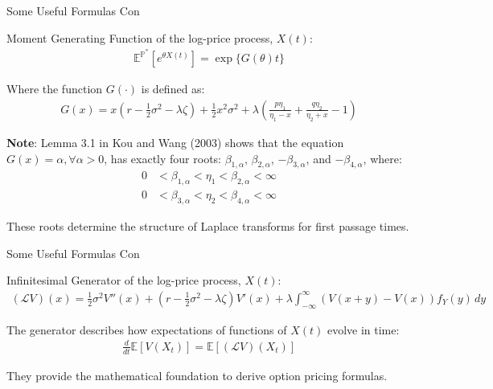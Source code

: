 \documentclass{beamer}
\begin{document}
\begin{frame}{Some Useful Formulas Con}

    {\footnotesize \footnotesize
    \par Moment Generating Function of the log-price process, \( X(t) \):
    \begin{align*}
        \mathbb{E}^{\mathbb{P}^*} \left[ e^{\theta X(t)} \right] = \exp\{G(\theta)t\}
    \end{align*}
    \par Where the function $G(\cdot)$ is defined as:
    \begin{align*}
        G(x) = x \left( r - \frac{1}{2} \sigma^2 - \lambda \zeta \right) + \frac{1}{2} x^2 \sigma^2 
        + \lambda \left( \frac{p \eta_1}{\eta_1 - x} + \frac{q \eta_2}{\eta_2 + x} - 1 \right)
    \end{align*}
    \par  \pause \textbf{Note}: Lemma 3.1 in Kou and Wang (2003) shows that the 
    equation \( G(x) = \alpha, \forall \alpha > 0 \), has exactly 
    four roots: \(\beta_{1,\alpha}\), \(\beta_{2,\alpha}\), \(-\beta_{3,\alpha}\), and \(-\beta_{4,\alpha}\), where: 
    \begin{align*}
        0 &< \beta_{1,\alpha} < \eta_1 < \beta_{2,\alpha} < \infty\\
        0 &< \beta_{3,\alpha} < \eta_2 < \beta_{4,\alpha} < \infty
    \end{align*}
    \par These roots determine the structure of Laplace transforms for first passage times.
    }
    
\end{frame}
\begin{frame}{Some Useful Formulas Con}

    {\footnotesize \footnotesize
    \par Infinitesimal Generator of the log-price process, \( X(t) \):
    \vspace{1em}
    \begin{align*}
        (\mathcal{L}V)(x) = \frac{1}{2}\sigma^2 V''(x) + \left(r - \frac{1}{2}\sigma^2 
        - \lambda\zeta\right)V'(x) + \lambda \int_{-\infty}^{\infty}\left(V(x+y) - V(x)\right)f_Y(y)\,dy
    \end{align*}
    \vspace{1em}
    \par  \pause  The generator describes how expectations of functions of \( X(t) \) evolve in time:
    \vspace{1em}
    \begin{align*}
        \frac{d}{dt}\mathbb{E}[V(X_t)] = \mathbb{E}[(\mathcal{L}V)(X_t)]
    \end{align*}
    \vspace{1em}
    \par They provide the mathematical foundation to derive option pricing formulas.



    }
    
\end{frame}
\end{document}
